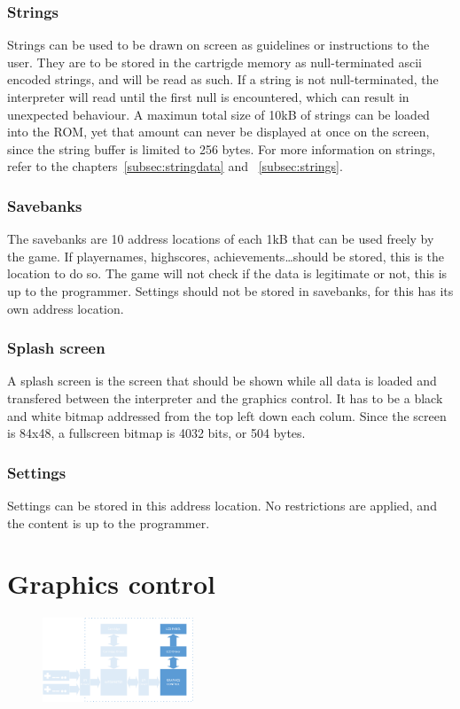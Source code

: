 		\subsubsection{Strings}
			\par Strings can be used to be drawn on screen as guidelines or instructions to the user.
			They are to be stored in the cartrigde memory as null-terminated ascii encoded strings, and will be read as such.
			If a string is not null-terminated, the interpreter will read until the first null is encountered, which can result in unexpected behaviour.
			A maximun total size of 10kB of strings can be loaded into the ROM, yet that amount can never be displayed at once on the screen, since the string buffer is limited to 256 bytes.
			For more information on strings, refer to the chapters~\ref{subsec:stringdata} and ~\ref{subsec:strings}.

		\subsubsection{Savebanks}
			\par The savebanks are 10 address locations of each 1kB that can be used freely by the game.
			If playernames, highscores, achievements\ldots should be stored, this is the location to do so.
			The game will not check if the data is legitimate or not, this is up to the programmer.
			Settings should not be stored in savebanks, for this has its own address location.

		\subsubsection{Splash screen}
			\par A splash screen is the screen that should be shown while all data is loaded and transfered between the interpreter and the graphics control.
			It has to be a black and white bitmap addressed from the top left down each colum.
			Since the screen is 84x48, a fullscreen bitmap is 4032 bits, or 504 bytes.

		\subsubsection{Settings}
			\par Settings can be stored in this address location.
			No restrictions are applied, and the content is up to the programmer.

\section{Graphics control}

	\begin{figure}[H]
		\centering
		\includegraphics[width=0.4\textwidth]{GameConsole/GraphicsControl_overview.PNG}
		\label{fig:GraphicsControlOverview}
	\end{figure}


